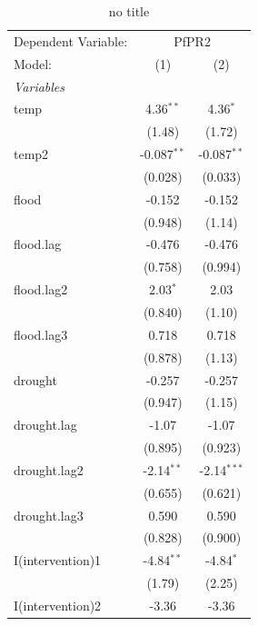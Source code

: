 
\begin{table}[htbp]
   \caption{\label{tab:conley} no title}
   \centering
   \begin{tabular}{lcc}
      \tabularnewline \midrule \midrule
      Dependent Variable: & \multicolumn{2}{c}{PfPR2}\\
      Model:           & (1)           & (2)\\  
      \midrule
      \emph{Variables}\\
      temp             & 4.36$^{**}$   & 4.36$^{*}$\\   
                       & (1.48)        & (1.72)\\   
      temp2            & -0.087$^{**}$ & -0.087$^{**}$\\   
                       & (0.028)       & (0.033)\\   
      flood            & -0.152        & -0.152\\   
                       & (0.948)       & (1.14)\\   
      flood.lag        & -0.476        & -0.476\\   
                       & (0.758)       & (0.994)\\   
      flood.lag2       & 2.03$^{*}$    & 2.03\\   
                       & (0.840)       & (1.10)\\   
      flood.lag3       & 0.718         & 0.718\\   
                       & (0.878)       & (1.13)\\   
      drought          & -0.257        & -0.257\\   
                       & (0.947)       & (1.15)\\   
      drought.lag      & -1.07         & -1.07\\   
                       & (0.895)       & (0.923)\\   
      drought.lag2     & -2.14$^{**}$  & -2.14$^{***}$\\   
                       & (0.655)       & (0.621)\\   
      drought.lag3     & 0.590         & 0.590\\   
                       & (0.828)       & (0.900)\\   
      I(intervention)1 & -4.84$^{**}$  & -4.84$^{*}$\\   
                       & (1.79)        & (2.25)\\   
      I(intervention)2 & -3.36         & -3.36\\   

\end{tabular}
\end{table}
